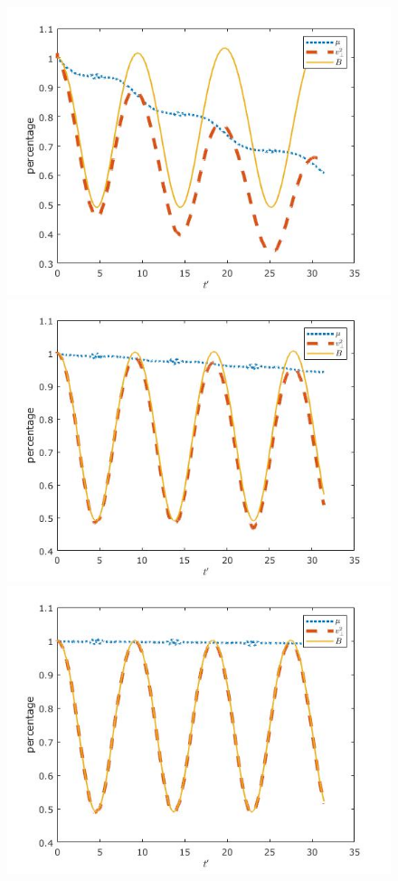 \documentclass{article}
\begin{document}
\begin{enumerate}
\begin{enumerate}
\begin{figure}[h]
\centering
\vbox{
\includegraphics[scale=0.3]{problem4a/magnetic_5000.jpg}
\includegraphics[scale=0.3]{problem4a/magnetic_10000.jpg}
}
\vbox{
\includegraphics[scale=0.3]{problem4a/magnetic_20000.jpg}
}
\end{figure}
\end{enumerate}
\end{enumerate}
\end{document}
